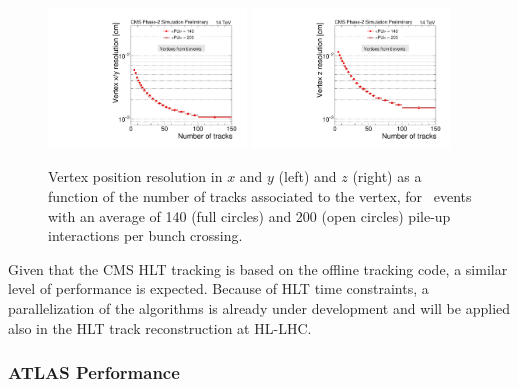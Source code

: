 \begin{figure}[h!tbp]
\begin{center}
  \includegraphics[width=0.47\textwidth]{figures/cmsupgrade/TDR-17-001_fig6_13_a_RecoAllAssoc2GenMatched_ResolX_vs_NumTracks_Sigma_PU.pdf} \hfill
  \includegraphics[width=0.47\textwidth]{figures/cmsupgrade/TDR-17-001_fig6_13_b_RecoAllAssoc2GenMatched_ResolZ_vs_NumTracks_Sigma_PU.pdf}
  \caption{Vertex position resolution in $x$ and $y$ (left) and $z$ (right) as a function of the number of tracks associated to the vertex, for \ttbar~events with an average of 140 (full circles) and 200 (open circles) pile-up interactions per bunch crossing.
 }
  \label{fig:cmsvertex}
\end{center}
\end{figure}

Given that the CMS HLT tracking is based on the offline tracking code, a similar level of performance is expected.
Because of HLT time constraints, a parallelization of the algorithms is already under development and will be applied also in the HLT track reconstruction at HL-LHC.

\subsubsection{ATLAS Performance}




